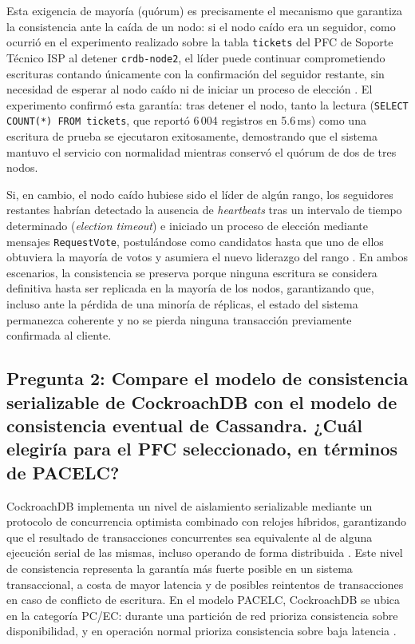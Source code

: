 \documentclass[12pt, a4paper]{article}
\begin{document}
Esta exigencia de mayoría (quórum) es precisamente el mecanismo que garantiza la consistencia ante la caída de un nodo: si el nodo caído era un seguidor, como ocurrió en el experimento realizado sobre la tabla \texttt{tickets} del PFC de Soporte Técnico ISP al detener \texttt{crdb-node2}, el líder puede continuar comprometiendo escrituras contando únicamente con la confirmación del seguidor restante, sin necesidad de esperar al nodo caído ni de iniciar un proceso de elección \cite{taft2020cockroachdb}. El experimento confirmó esta garantía: tras detener el nodo, tanto la lectura (\texttt{SELECT COUNT(*) FROM tickets}, que reportó 6\,004 registros en 5.6\,ms) como una escritura de prueba se ejecutaron exitosamente, demostrando que el sistema mantuvo el servicio con normalidad mientras conservó el quórum de dos de tres nodos.

Si, en cambio, el nodo caído hubiese sido el líder de algún rango, los seguidores restantes habrían detectado la ausencia de \textit{heartbeats} tras un intervalo de tiempo determinado (\textit{election timeout}) e iniciado un proceso de elección mediante mensajes \texttt{RequestVote}, postulándose como candidatos hasta que uno de ellos obtuviera la mayoría de votos y asumiera el nuevo liderazgo del rango \cite{ongaro2014raft}. En ambos escenarios, la consistencia se preserva porque ninguna escritura se considera definitiva hasta ser replicada en la mayoría de los nodos, garantizando que, incluso ante la pérdida de una minoría de réplicas, el estado del sistema permanezca coherente y no se pierda ninguna transacción previamente confirmada al cliente.

\subsection*{Pregunta 2: Compare el modelo de consistencia serializable de CockroachDB con el modelo de consistencia eventual de Cassandra. ¿Cuál elegiría para el PFC seleccionado, en términos de PACELC?}

CockroachDB implementa un nivel de aislamiento serializable mediante un protocolo de concurrencia optimista combinado con relojes híbridos, garantizando que el resultado de transacciones concurrentes sea equivalente al de alguna ejecución serial de las mismas, incluso operando de forma distribuida \cite{taft2020cockroachdb}. Este nivel de consistencia representa la garantía más fuerte posible en un sistema transaccional, a costa de mayor latencia y de posibles reintentos de transacciones en caso de conflicto de escritura. En el modelo PACELC, CockroachDB se ubica en la categoría PC/EC: durante una partición de red prioriza consistencia sobre disponibilidad, y en operación normal prioriza consistencia sobre baja latencia \cite{abadi2012consistency}.
\end{document}
